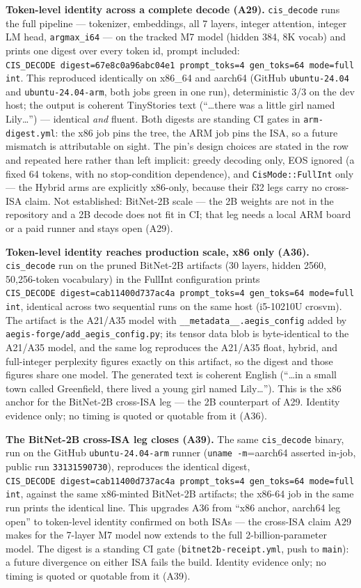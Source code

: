 \documentclass[11pt]{article}
\begin{document}
\textbf{Token-level identity across a complete decode (A29).} \texttt{cis\_decode} runs the full pipeline ---
tokenizer, embeddings, all 7 layers, integer attention, integer LM head, \texttt{argmax\_i64} --- on the
tracked M7 model (hidden 384, 8K vocab) and prints one digest over every token id, prompt
included: \texttt{CIS\_DECODE\ digest=67e8c0a96abc04e1\ prompt\_toks=4\ gen\_toks=64\ mode=fullint}. This
reproduced identically on x86\_64 and aarch64 (GitHub \texttt{ubuntu-24.04} and \texttt{ubuntu-24.04-arm}, both
jobs green in one run), deterministic 3/3 on the dev host; the output is coherent TinyStories
text (``\ldots there was a little girl named Lily\ldots{}'') --- identical \emph{and} fluent. Both digests are standing
CI gates in \texttt{arm-digest.yml}: the x86 job pins the tree, the ARM job pins the ISA, so a future
mismatch is attributable on sight. The pin's design choices are stated in the row and repeated
here rather than left implicit: greedy decoding only, EOS ignored (a fixed 64 tokens, with no
stop-condition dependence), and \texttt{CisMode::FullInt} only --- the Hybrid arms are explicitly
x86-only, because their f32 legs carry no cross-ISA claim. Not established: BitNet-2B scale --- the
2B weights are not in the repository and a 2B decode does not fit in CI; that leg needs a local
ARM board or a paid runner and stays open (A29).

\textbf{Token-level identity reaches production scale, x86 only (A36).} \texttt{cis\_decode} run on the pruned
BitNet-2B artifacts (30 layers, hidden 2560, 50,256-token vocabulary) in the FullInt configuration
prints \texttt{CIS\_DECODE\ digest=cab11400d737ac4a\ prompt\_toks=4\ gen\_toks=64\ mode=fullint}, identical
across two sequential runs on the same host (i5-10210U crosvm). The artifact is the A21/A35 model
with \texttt{\_\_metadata\_\_.aegis\_config} added by \texttt{aegis-forge/add\_aegis\_config.py}; its tensor data blob
is byte-identical to the A21/A35 model, and the same log reproduces the A21/A35 float, hybrid, and
full-integer perplexity figures exactly on this artifact, so the digest and those figures share one
model. The generated text is coherent English (``\ldots in a small town called Greenfield, there lived a
young girl named Lily\ldots{}''). This is the x86 anchor for the BitNet-2B cross-ISA leg --- the 2B
counterpart of A29. Identity evidence only; no timing is quoted or quotable from it (A36).

\textbf{The BitNet-2B cross-ISA leg closes (A39).} The same \texttt{cis\_decode} binary, run on the GitHub
\texttt{ubuntu-24.04-arm} runner (\texttt{uname\ -m}=aarch64 asserted in-job, public run \texttt{33131590730}),
reproduces the identical digest, \texttt{CIS\_DECODE\ digest=cab11400d737ac4a\ prompt\_toks=4\ gen\_toks=64\ mode=fullint}, against the same x86-minted BitNet-2B artifacts; the x86-64 job in the same run
prints the identical line. This upgrades A36 from ``x86 anchor, aarch64 leg open'' to token-level
identity confirmed on both ISAs --- the cross-ISA claim A29 makes for the 7-layer M7 model now
extends to the full 2-billion-parameter model. The digest is a standing CI gate
(\texttt{bitnet2b-receipt.yml}, push to \texttt{main}): a future divergence on either ISA fails the build.
Identity evidence only; no timing is quoted or quotable from it (A39).
\end{document}
